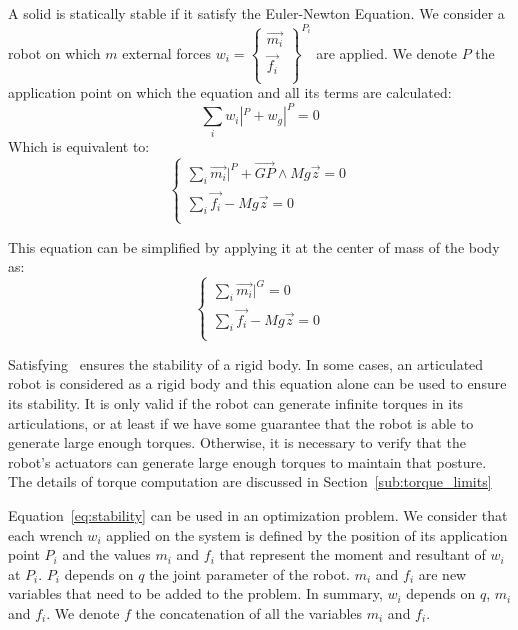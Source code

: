 A solid is statically stable if it satisfy the Euler-Newton Equation. We consider a robot on which $m$ external forces $w_i = \left\{ \begin{array}{r}
    \vec{m_i}\\
    \vec{f_i}\\
\end{array} \right\}^{P_i}$ are applied. We denote $P$ the application point on which the equation and all its terms are calculated:
\begin{equation}
  \sum\limits_i w_i|^P + w_g|^P = 0
\end{equation}
Which is equivalent to:
\begin{equation}
\left\{
\begin{array}{r}
  \sum\limits_i \vec{m_i}|^P + \overrightarrow{GP}\wedge Mg\vec{z} = 0 \\
  \sum\limits_i \vec{f_i} - Mg\vec{z} = 0 \\
\end{array}
\right.
\end{equation}

This equation can be simplified by applying it at the center of mass of the body as:
\begin{equation}
  \left\{
  \begin{array}{r}
    \sum\limits_i \vec{m_i}|^G = 0 \\
    \sum\limits_i \vec{f_i} - Mg\vec{z} = 0 \\
  \end{array}
  \right.
\label{eq:stability}
\end{equation}

Satisfying~ ensures the stability of a rigid body.
In some cases, an articulated robot is considered as a rigid body and this equation alone can be used to ensure its stability.
It is only valid if the robot can generate infinite torques in its articulations, or at least if we have some guarantee that the robot is able to generate large enough torques.
Otherwise, it is necessary to verify that the robot's actuators can generate large enough torques to maintain that posture. The details of torque computation are discussed in Section~\ref{sub:torque_limits}

Equation~\ref{eq:stability} can be used in an optimization problem.
We consider that each wrench $w_i$ applied on the system is defined by the position of its application point $P_i$ and the values $m_i$ and $f_i$ that represent the moment and resultant of $w_i$ at $P_i$. $P_i$ depends on $q$ the joint parameter of the robot.
$m_i$ and $f_i$ are new variables that need to be added to the problem. In summary, $w_i$ depends on $q$, $m_i$ and $f_i$.
We denote $f$ the concatenation of all the variables $m_i$ and $f_i$.

